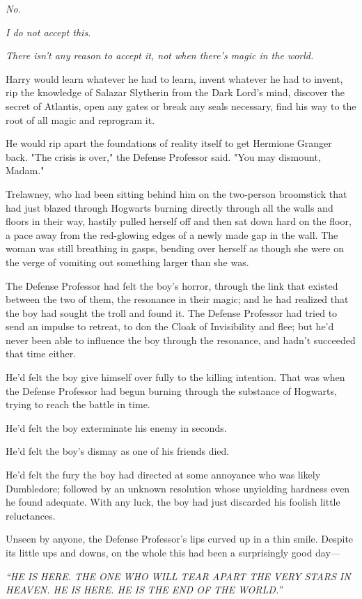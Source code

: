\emph{No.}

\emph{I do not accept this.}

\emph{There isn't any reason to accept it, not when there's magic in the world.}

Harry would learn whatever he had to learn, invent whatever he had to invent, 
rip the knowledge of Salazar Slytherin from the Dark Lord's mind, discover the 
secret of Atlantis, open any gates or break any seals necessary, find his way 
to the root of all magic and reprogram it.

He would rip apart the foundations of reality itself to get Hermione Granger 
back.
\sbreak
"The crisis is over," the Defense Professor said. "You may dismount, Madam."

Trelawney, who had been sitting behind him on the two-person broomstick that 
had just blazed through Hogwarts burning directly through all the walls and 
floors in their way, hastily pulled herself off and then sat down hard on the 
floor, a pace away from the red-glowing edges of a newly made gap in the wall. 
The woman was still breathing in gasps, bending over herself as though she were 
on the verge of vomiting out something larger than she was.

The Defense Professor had felt the boy's horror, through the link that existed 
between the two of them, the resonance in their magic; and he had realized that 
the boy had sought the troll and found it. The Defense Professor had tried to 
send an impulse to retreat, to don the Cloak of Invisibility and flee; but he'd 
never been able to influence the boy through the resonance, and hadn't 
succeeded that time either.

He'd felt the boy give himself over fully to the killing intention. That was 
when the Defense Professor had begun burning through the substance of Hogwarts, 
trying to reach the battle in time.

He'd felt the boy exterminate his enemy in seconds.

He'd felt the boy's dismay as one of his friends died.

He'd felt the fury the boy had directed at some annoyance who was likely 
Dumbledore; followed by an unknown resolution whose unyielding hardness even he 
found adequate. With any luck, the boy had just discarded his foolish little 
reluctances.

Unseen by anyone, the Defense Professor's lips curved up in a thin smile. 
Despite its little ups and downs, on the whole this had been a surprisingly 
good day---

\emph{``HE IS HERE. THE ONE WHO WILL TEAR APART THE VERY STARS IN 
HEAVEN. HE IS HERE. HE IS THE END OF THE WORLD.''}
